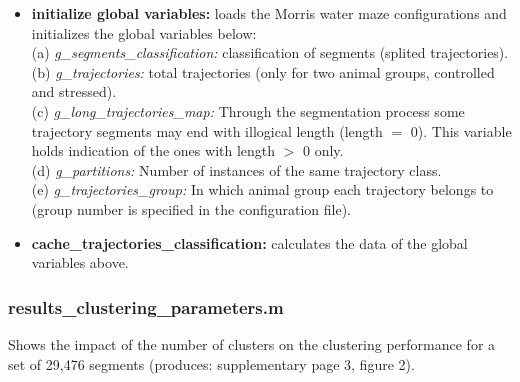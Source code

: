 \documentclass[12pt,titlepage]{article}
\begin{document}
\begin{doublespace}
\begin{itemize}
	\item\textbf{initialize global variables:} loads the Morris water maze configurations and initializes the global variables below:\\
	(a) \textit{g\_segments\_classification:} classification of segments (splited trajectories).\\
	(b) \textit{g\_trajectories:} total trajectories (only for two animal groups, controlled and stressed).\\
	(c) \textit{g\_long\_trajectories\_map:} Through the segmentation process some trajectory segments may end with illogical length (length $=$ 0). This variable holds  indication of the ones with length $>$ 0 only.\\
	(d) \textit{g\_partitions:} Number of instances of the same trajectory class.\\
	(e) \textit{g\_trajectories\_group:} In which animal group each trajectory belongs to (group number is specified in the configuration file).
	\item\textbf{cache\_trajectories\_classification:}  calculates the data of the global variables above.
\end{itemize}

\subsubsection{results\_clustering\_parameters.m}
Shows the impact of the number of clusters on the clustering performance for a set of 29,476 segments (produces: supplementary page 3, figure 2).


\end{doublespace}
\end{document}
